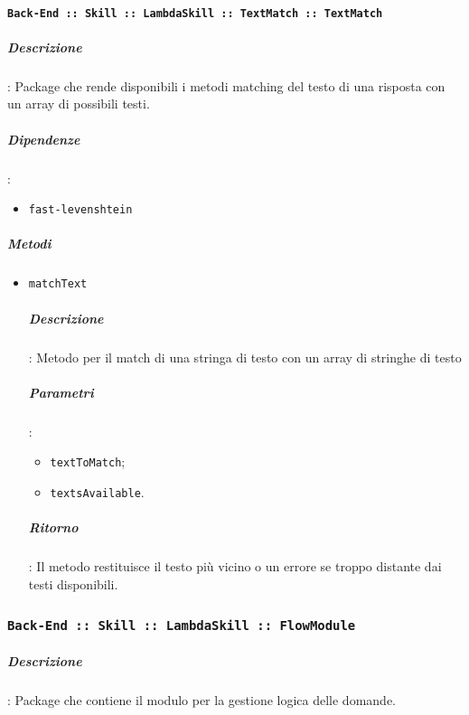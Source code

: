 \documentclass[../DefinizioneDiProdotto_v2.0.0.tex]{subfiles}
\begin{document}
\paragraph{\texttt{Back-End :: Skill :: LambdaSkill :: TextMatch :: TextMatch}}
\subparagraph{Descrizione}: Package che rende disponibili i metodi matching del testo di una risposta con un array di possibili testi.
\subparagraph{Dipendenze}: \begin{itemize}
\item \texttt{fast-levenshtein}
\end{itemize}
\subparagraph{Metodi}
\begin{itemize}
	\item \texttt{matchText}
	      \subparagraph{Descrizione}: Metodo per il match di una stringa di testo con un array di stringhe di testo
	      \subparagraph{Parametri}:
	      \begin{itemize}
	      	\item \texttt{textToMatch};
	      	\item \texttt{textsAvailable}.
	      \end{itemize}
	      \subparagraph{Ritorno}: Il metodo restituisce il testo più vicino o un errore se troppo distante dai testi disponibili.
\end{itemize}

\subsubsection{\texttt{Back-End :: Skill :: LambdaSkill :: FlowModule}}
\subparagraph{Descrizione}:
Package che contiene il modulo per la gestione logica delle domande.
\end{document}
